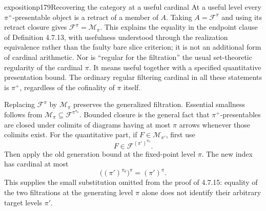 \begin{dcomment}{exposition}{p179}{Recovering the category at a useful cardinal}
At a useful level every $\pi^+$-presentable object is a retract of a member of $A$. Taking $A=\mathcal F^\pi$ and using its retract closure gives $\mathcal F^\pi=\mathcal M_\pi$. This explains the equality in the endpoint clause of Definition 4.7.13, with usefulness understood through the realization equivalence rather than the faulty bare slice criterion; it is not an additional form of cardinal arithmetic. Nor is ``regular for the filtration'' the usual set-theoretic regularity of the cardinal $\pi$. It means useful together with a specified quantitative presentation bound. The ordinary regular filtering cardinal in all these statements is $\pi^+$, regardless of the cofinality of $\pi$ itself.

Replacing $\mathcal F^\pi$ by $\mathcal M_\pi$ preserves the generalized filtration. Essential smallness follows from $\mathcal M_\pi\subseteq\mathcal F^{\pi^{\pi_0}}$. Bounded closure is the general fact that $\pi^+$-presentables are closed under colimits of diagrams having at most $\pi$ arrows whenever those colimits exist. For the quantitative part, if $F\in\mathcal M_{\pi'}$, first use
\[
 F\in\mathcal F^{(\pi')^{\pi_0}}.
\]
Then apply the old generation bound at the fixed-point level $\pi$. The new index has cardinal at most
\[
 \bigl((\pi')^{\pi_0}\bigr)^\pi=(\pi')^\pi.
\]
This supplies the small substitution omitted from the proof of 4.7.15: equality of the two filtrations at the generating level $\pi$ alone does not identify their arbitrary target levels $\pi'$.
\end{dcomment}



